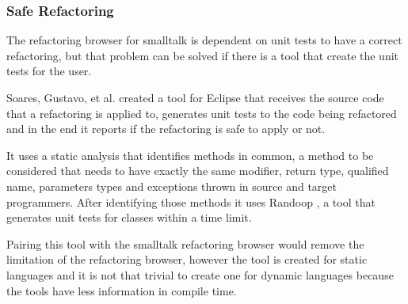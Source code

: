 %

\subsubsection{Safe Refactoring}

The refactoring browser for smalltalk is dependent on unit tests to have a correct refactoring, but that problem can be solved if there is a tool that create the unit tests for the user.

Soares, Gustavo, et al. \cite{soares2010making} created a tool for Eclipse that receives the source code that a refactoring is applied to, generates unit tests to the code being refactored and in the end it reports if the refactoring is safe to apply or not.

It uses a static analysis that identifies methods in common, a method to be considered that needs to have exactly the same modifier, return type, qualified name, parameters types and exceptions thrown in source and target programmers.
After identifying those methods it uses Randoop \cite{pacheco2007feedback},  %
 a tool that generates unit tests for classes within a time limit.

Pairing this tool with the smalltalk refactoring browser would remove the limitation of the refactoring browser, however the tool is created for static languages and it is not that trivial to create one for dynamic languages because the tools have less information in compile time.